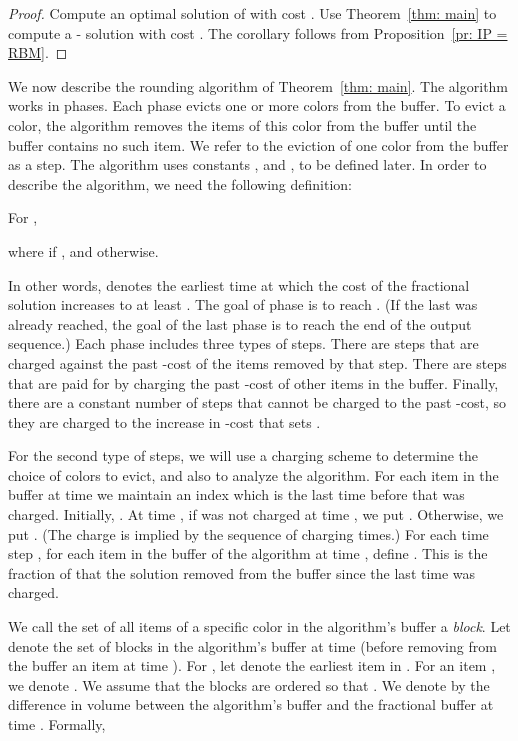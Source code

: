 \documentclass[11pt]{article}
\begin{document}
\begin{proof}
Compute an optimal solution  of  with cost
. Use Theorem~\ref{thm: main}
to compute a - solution  with cost
.
The corollary follows from Proposition~\ref{pr: IP = RBM}.
\end{proof}


We now describe the rounding algorithm of Theorem~\ref{thm: main}.
The algorithm works in phases. Each phase evicts one or more colors
from the buffer. To evict a color, the algorithm removes the items of
this color from the buffer until the buffer contains no such item. We
refer to the eviction of one color from the buffer as a step. The algorithm
uses constants , and
, to be defined
later. In order to describe the algorithm, we need the following definition:
\begin{definition}
For ,

where  if , and  otherwise. 
\end{definition}
In other words,  denotes the earliest time at which the cost of
the fractional solution  increases to at least .
The goal of phase  is to reach . (If the last  was
already reached, the goal of the last phase is to reach the end
of the output sequence.) Each phase includes
three types of steps. There are steps that are charged against the
past -cost of the items removed by that step. There are steps
that are paid for by charging the past -cost of other items in
the buffer. Finally, there are a constant number of steps that cannot
be charged to the past -cost, so they are charged to the increase
in -cost that sets .

For the second type of steps, we will use a charging scheme to determine
the choice of colors to evict, and also to analyze the algorithm. For each item
 in the buffer at time  we
maintain an index  which is the last time before  that  was
charged. Initially, . At time , if  was not charged at
time , we put . Otherwise, we put .
(The charge is implied by the sequence of charging times.)
For each time step , for each item  in the buffer of the algorithm at time
, define . This is the fraction of  that the
solution  removed from the buffer since the last time  was charged.

We call the set of all items of a specific color in the algorithm's
buffer a {\em block}. Let 
denote the set of blocks in the algorithm's buffer at time  (before
removing from the buffer an item at time ). For ,
let  denote the earliest item in .
For an item , we denote .
We assume that the
blocks are ordered so that .
We denote by  the difference in volume between
the algorithm's buffer and the fractional buffer at time .
Formally,
\end{document}
